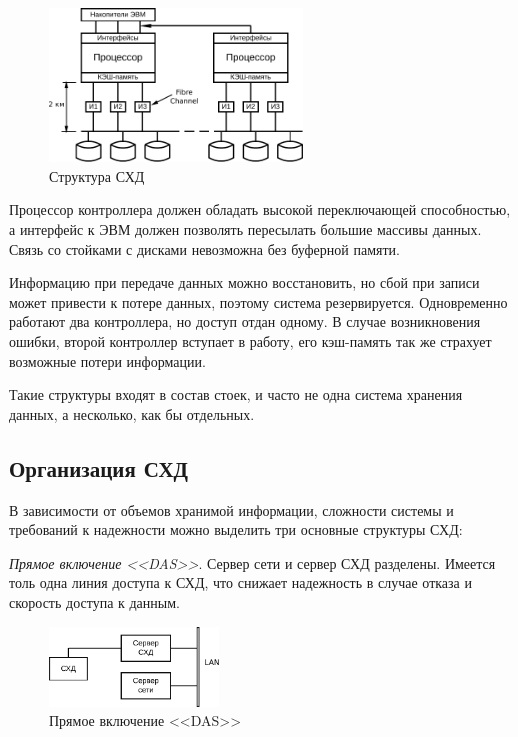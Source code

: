 \documentclass[unicode, 12pt, a4paper, oneside]{article}
\begin{document}
\begin{figure}[H]
\centering
\includegraphics[width=0.6\textwidth]{151_struct.pdf}
\caption{Структура СХД}
\end{figure}

Процессор контроллера должен обладать высокой переключающей способностью, а интерфейс к ЭВМ должен позволять пересылать большие массивы данных. Связь со стойками с дисками невозможна без буферной памяти.

Информацию при передаче данных можно восстановить, но сбой при записи может привести к потере данных, поэтому система резервируется. Одновременно работают два контроллера, но доступ отдан одному. В случае возникновения ошибки, второй контроллер вступает в работу, его кэш-память так же страхует возможные потери информации.

Такие структуры входят в состав стоек, и часто не одна система хранения данных, а несколько, как бы отдельных.

\subsection*{Организация СХД}

В зависимости от объемов хранимой информации, сложности системы и требований к надежности можно выделить три основные структуры СХД:

\textit{Прямое включение <<DAS>>}. Сервер сети и сервер СХД разделены. Имеется толь одна линия доступа к СХД, что снижает надежность в случае отказа и скорость доступа к данным.

\begin{figure}[H]
\centering
\includegraphics[width=0.4\textwidth]{151_das.pdf}
\caption{Прямое включение <<DAS>>}
\end{figure}
\end{document}
